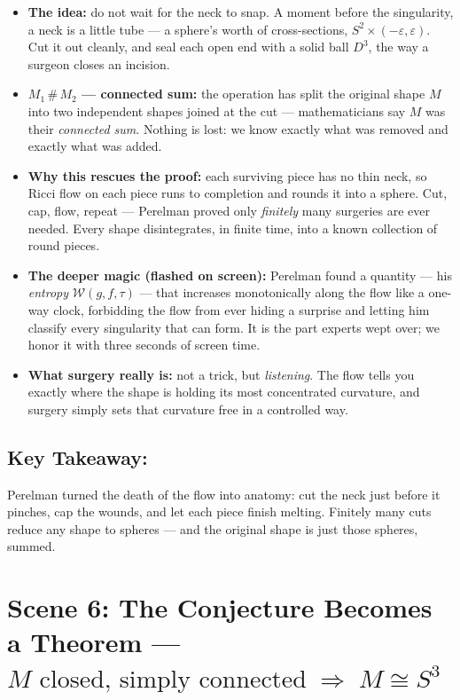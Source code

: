 \documentclass[11pt]{article}
\begin{document}
\begin{itemize}
  \item \textbf{The idea:} do not wait for the neck to snap. A moment before the
  singularity, a neck is a little tube --- a sphere's worth of cross-sections,
  \( S^2 \times (-\varepsilon, \varepsilon) \). Cut it out cleanly, and seal each
  open end with a solid ball $D^3$, the way a surgeon closes an incision.
  \item \textbf{\( M_1 \,\#\, M_2 \) --- connected sum:} the operation has split the
  original shape $M$ into two independent shapes joined at the cut --- mathematicians
  say $M$ was their \emph{connected sum}. Nothing is lost: we know exactly what was
  removed and exactly what was added.
  \item \textbf{Why this rescues the proof:} each surviving piece has no thin neck,
  so Ricci flow on each piece runs to completion and rounds it into a sphere. Cut,
  cap, flow, repeat --- Perelman proved only \emph{finitely} many surgeries are ever
  needed. Every shape disintegrates, in finite time, into a known collection of
  round pieces.
  \item \textbf{The deeper magic (flashed on screen):} Perelman found a quantity ---
  his \emph{entropy} \( \mathcal{W}(g, f, \tau) \) --- that increases monotonically
  along the flow like a one-way clock, forbidding the flow from ever hiding a
  surprise and letting him classify every singularity that can form. It is the part
  experts wept over; we honor it with three seconds of screen time.
  \item \textbf{What surgery really is:} not a trick, but \emph{listening}. The flow
  tells you exactly where the shape is holding its most concentrated curvature, and
  surgery simply sets that curvature free in a controlled way.
\end{itemize}

\subsection*{Key Takeaway:}

Perelman turned the death of the flow into anatomy: cut the neck just before it
pinches, cap the wounds, and let each piece finish melting. Finitely many cuts reduce
any shape to spheres --- and the original shape is just those spheres, summed.

\hrulefill

\section*{Scene 6: The Conjecture Becomes a Theorem --- \( M \text{ closed, simply connected} \;\Longrightarrow\; M \cong S^3 \)}
\end{document}
